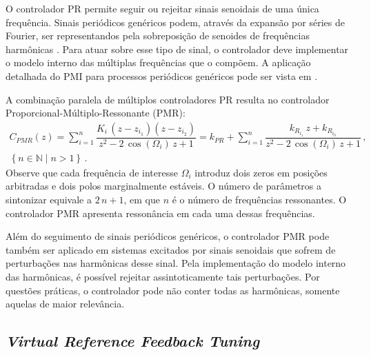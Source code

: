 \documentclass[repeatfields,oneside]{tcc}
\newcommand{\mycdot}{ \, }
\newcommand{\myC}[2][]{ C_{#1} \left( #2 \right) }
\begin{document}
O controlador PR permite seguir ou rejeitar sinais senoidais de uma única frequência.
Sinais periódicos genéricos podem, através da expansão por séries de Fourier, ser representandos pela sobreposição de senoides de frequências harmônicas \cite{Haykin2001, Kreyszig2014}.
Para atuar sobre esse tipo de sinal, o controlador deve implementar o modelo interno das múltiplas frequências que o compõem.
A aplicação detalhada do PMI para processos periódicos genéricos pode ser vista em \cite{Flores2012}.

A combinação paralela de múltiplos controladores PR resulta no controlador Pro\-por\-ci\-o\-nal-Múl\-ti\-plo-Res\-so\-nan\-te (PMR):
\begin{equation}
\begin{gathered}
    \myC[PMR]{z}
    = \sum_{i=1}^{n} \dfrac{ K_i \mycdot (z - z_{i_1}) (z - z_{i_2}) }
                           { z^2 - 2 \mycdot \cos \left( \Omega_i \right) \mycdot z + 1 }
    = k_{PR} + \sum_{i=1}^{n} \dfrac{ k_{R_{i_1}} \mycdot z + k_{R_{i_0}} }
                                 { z^2 - 2 \mycdot \cos \left( \Omega_i \right) \mycdot z + 1 }
    \,,
    \\
    \left\{ n \in \mathbb{N} \mid n > 1 \right\}
    \,.
\end{gathered}
\end{equation}
Observe que cada frequência de interesse $\Omega_i$ introduz dois zeros em posições arbitradas e dois polos marginalmente estáveis.
O número de parâmetros a sintonizar equivale a $2 \mycdot n + 1$, em que $n$ é o número de frequências ressonantes.
O controlador PMR apresenta ressonância em cada uma dessas frequências.

Além do seguimento de sinais periódicos genéricos, o controlador PMR pode também ser aplicado em sistemas excitados por sinais senoidais que sofrem de perturbações nas harmônicas desse sinal.
Pela implementação do modelo interno das harmônicas, é possível rejeitar assintoticamente tais perturbações.
Por questões práticas, o controlador pode não conter todas as harmônicas, somente aquelas de maior relevância.

\subsection{\textit{Virtual Reference Feedback Tuning}}\label{sec:VRFT}
\end{document}
